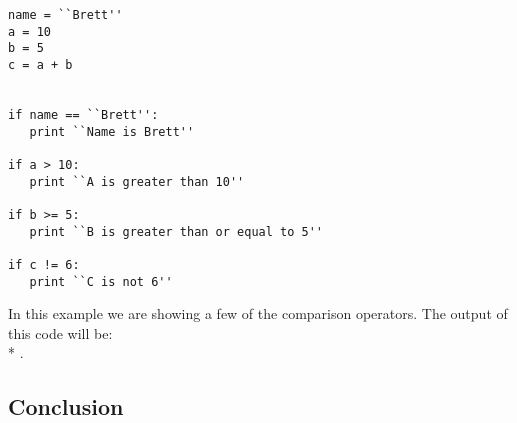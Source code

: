 \begin{lstlisting}[caption={Comparison Operators}]
name = ``Brett''
a = 10
b = 5
c = a + b


if name == ``Brett'':
   print ``Name is Brett''

if a > 10:
   print ``A is greater than 10''

if b >= 5:
   print ``B is greater than or equal to 5''

if c != 6:
   print ``C is not 6''
\end{lstlisting}

In this example we are showing a few of the comparison operators.
The output of this code will be:\\*
.

\subsection{Conclusion}

